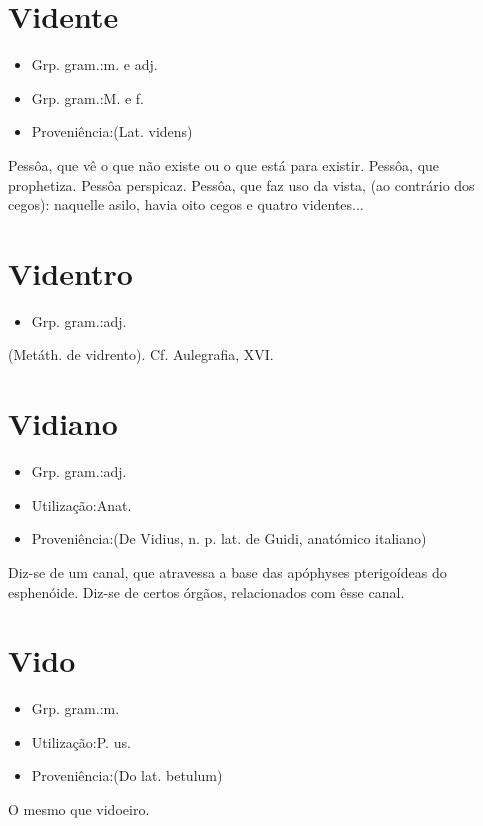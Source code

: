 \documentclass{article}
\begin{document}
\section{Vidente}
\begin{itemize}
\item {Grp. gram.:m.  e  adj.}
\end{itemize}
\begin{itemize}
\item {Grp. gram.:M.  e  f.}
\end{itemize}
\begin{itemize}
\item {Proveniência:(Lat. \textunderscore videns\textunderscore )}
\end{itemize}
Pessôa, que vê o que não existe ou o que está para existir.
Pessôa, que prophetiza.
Pessôa perspicaz.
Pessôa, que faz uso da vista, (ao contrário dos cegos): \textunderscore naquelle asilo, havia oito cegos e quatro videntes...\textunderscore 
\section{Videntro}
\begin{itemize}
\item {Grp. gram.:adj.}
\end{itemize}
(Metáth. de \textunderscore vidrento\textunderscore ). Cf. \textunderscore Aulegrafia\textunderscore , XVI.
\section{Vidiano}
\begin{itemize}
\item {Grp. gram.:adj.}
\end{itemize}
\begin{itemize}
\item {Utilização:Anat.}
\end{itemize}
\begin{itemize}
\item {Proveniência:(De \textunderscore Vidius\textunderscore , n. p. lat. de \textunderscore Guidi\textunderscore , anatómico italiano)}
\end{itemize}
Diz-se de um canal, que atravessa a base das apóphyses pterigoídeas do esphenóide.
Diz-se de certos órgãos, relacionados com êsse canal.
\section{Vido}
\begin{itemize}
\item {Grp. gram.:m.}
\end{itemize}
\begin{itemize}
\item {Utilização:P. us.}
\end{itemize}
\begin{itemize}
\item {Proveniência:(Do lat. \textunderscore betulum\textunderscore )}
\end{itemize}
O mesmo que \textunderscore vidoeiro\textunderscore .
\end{document}
